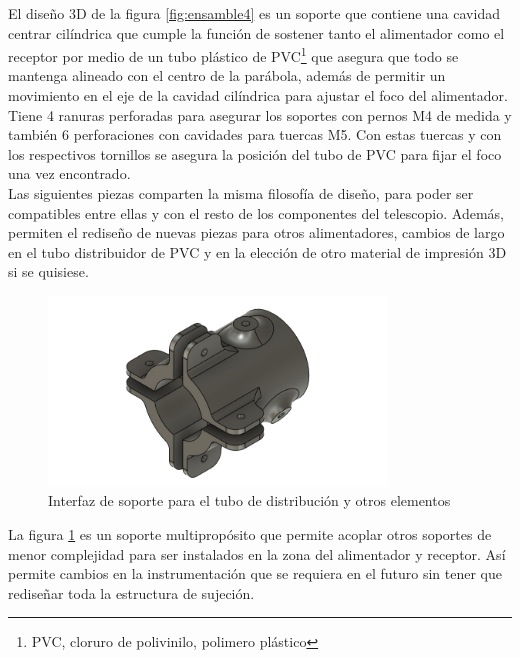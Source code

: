 El diseño 3D de la figura \ref{fig:ensamble4} es un soporte que contiene una cavidad centrar cilíndrica que cumple la función de sostener tanto el alimentador como el receptor por medio de un tubo plástico de PVC\footnote{PVC, cloruro de polivinilo, polimero plástico} que asegura que todo se mantenga alineado con el centro de la parábola, además de permitir un movimiento en el eje de la cavidad cilíndrica para ajustar el foco del alimentador.\\

Tiene 4 ranuras perforadas para asegurar los soportes con pernos M4 de medida y también 6 perforaciones con cavidades para tuercas M5. Con estas tuercas y con los respectivos tornillos se asegura la posición del tubo de PVC para fijar el foco una vez encontrado.\\

Las siguientes piezas comparten la misma filosofía de diseño, para poder ser compatibles entre ellas y con el resto de los componentes del telescopio. Además, permiten el rediseño de nuevas piezas para otros alimentadores, cambios de largo en el tubo distribuidor de PVC y en la elección de otro material de impresión 3D si se quisiese.\\

\begin{figure}
    \centering
    \includegraphics[width=0.8\textwidth]{img/soporte3D1v1}
    \caption{Interfaz de soporte para el tubo de distribución y otros elementos}
    \label{fig:ensamble5}
\end{figure}

La figura \ref{fig:ensamble5} es un soporte multipropósito que permite acoplar otros soportes de menor complejidad para ser instalados en la zona del alimentador y receptor. Así permite cambios en la instrumentación que se requiera en el futuro sin tener que rediseñar toda la estructura de sujeción.\\

